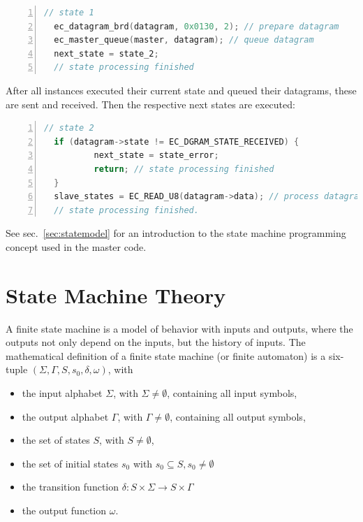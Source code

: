 \documentclass[a4paper,12pt,BCOR6mm,bibtotoc,idxtotoc]{scrbook}
\begin{document}
\begin{lstlisting}[gobble=2,language=C,numbers=left]
  // state 1
  ec_datagram_brd(datagram, 0x0130, 2); // prepare datagram
  ec_master_queue(master, datagram); // queue datagram
  next_state = state_2;
  // state processing finished
\end{lstlisting}

After all instances executed their current state and queued their
datagrams, these are sent and received. Then the respective next
states are executed:

\begin{lstlisting}[gobble=2,language=C,numbers=left]
  // state 2
  if (datagram->state != EC_DGRAM_STATE_RECEIVED) {
          next_state = state_error;
          return; // state processing finished
  }
  slave_states = EC_READ_U8(datagram->data); // process datagram
  // state processing finished.
\end{lstlisting}

See sec.~\ref{sec:statemodel} for an introduction to the state machine
programming concept used in the master code.


\section{State Machine Theory}
\label{sec:fsmtheory}

A finite state machine \cite{automata} is a model of behavior with
inputs and outputs, where the outputs not only depend on the inputs,
but the history of inputs. The mathematical definition of a finite
state machine (or finite automaton) is a six-tuple $(\Sigma, \Gamma,
S, s_0, \delta, \omega)$, with

\begin{itemize}
\item the input alphabet $\Sigma$, with $\Sigma \neq
  \emptyset$, containing all input symbols,
\item the output alphabet $\Gamma$, with $\Gamma \neq
  \emptyset$, containing all output symbols,
\item the set of states $S$, with $S \neq \emptyset$,
\item the set of initial states $s_0$ with $s_0 \subseteq S, s_0 \neq
  \emptyset$
\item the transition function $\delta: S \times \Sigma \rightarrow S
  \times \Gamma$
\item the output function $\omega$.
\end{itemize}
\end{document}
